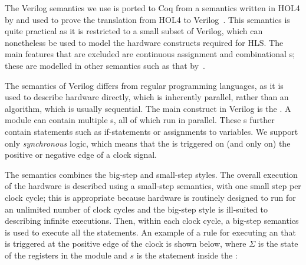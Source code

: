 The Verilog semantics we use is ported to Coq from a semantics written in HOL4 by \textcite{loow19_proof_trans_veril_devel_hol} and used to prove the translation from HOL4 to Verilog~\cite{loow19_verif_compil_verif_proces}. %
This semantics is quite practical as it is restricted to a small subset of Verilog, which can nonetheless be used to model the hardware constructs required for HLS.  The main features that are excluded are continuous assignment and combinational \alwaysblock{}s; these are modelled in other semantics such as that by~\textcite{meredith10_veril}. %

The semantics of Verilog differs from regular programming languages, as it is used to describe hardware directly, which is inherently parallel, rather than an algorithm, which is usually sequential.  The main construct in Verilog is the \alwaysblock{}.
A module can contain multiple \alwaysblock{}s, all of which run in parallel.  These \alwaysblock{}s further contain statements such as if-statements or assignments to variables.  We support only \emph{synchronous} logic, which means that the \alwaysblock{} is triggered on (and only on) the positive or negative edge of a clock signal.

The semantics combines the big-step and small-step styles. The overall execution of the hardware is described using a small-step semantics, with one small step per clock cycle; this is appropriate because hardware is routinely designed to run for an unlimited number of clock cycles and the big-step style is ill-suited to describing infinite executions. Then, within each clock cycle, a big-step semantics is used to execute all the statements.
An example of a rule for executing an \alwaysblock{} that is triggered at the positive edge of the clock is shown below, where $\Sigma$ is the state of the registers in the module and $s$ is the statement inside the \alwaysblock{}:

